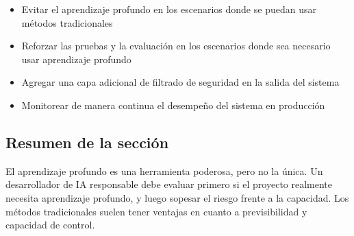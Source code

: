 \begin{itemize}
    \item Evitar el aprendizaje profundo en los escenarios donde se puedan usar métodos tradicionales
    \item Reforzar las pruebas y la evaluación en los escenarios donde sea necesario usar aprendizaje profundo
    \item Agregar una capa adicional de filtrado de seguridad en la salida del sistema
    \item Monitorear de manera continua el desempeño del sistema en producción
\end{itemize}

\subsection{Resumen de la sección}

El aprendizaje profundo es una herramienta poderosa, pero no la única. Un desarrollador de IA responsable debe evaluar primero si el proyecto realmente necesita aprendizaje profundo, y luego sopesar el riesgo frente a la capacidad. Los métodos tradicionales suelen tener ventajas en cuanto a previsibilidad y capacidad de control.

